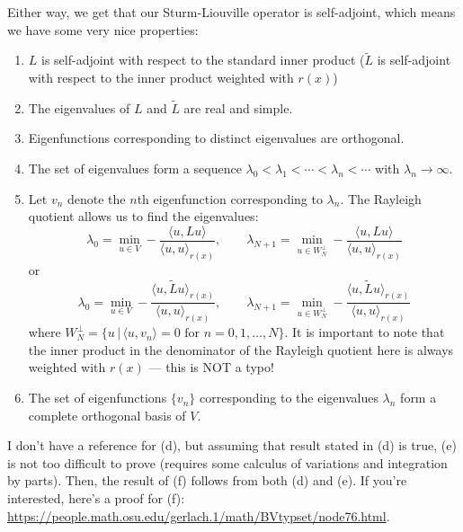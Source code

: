 Either way, we get that our Sturm-Liouville operator is self-adjoint, which means we have some very nice properties:
\begin{enumerate}
\renewcommand{\labelenumi}{(\alph{enumi})}
\item $L$ is self-adjoint with respect to the standard inner product ($\tilde{L}$ is self-adjoint with respect to the inner product weighted with $r(x)$)

\item The eigenvalues of $L$ and $\tilde{L}$ are real and simple.

\item Eigenfunctions corresponding to distinct eigenvalues are orthogonal.

\item The set of eigenvalues form a sequence $\lambda_0 < \lambda_1 < \cdots < \lambda_n < \cdots$ with $\lambda_n \to \infty$.

\item Let $v_n$ denote the $n$th eigenfunction corresponding to $\lambda_n$. The Rayleigh quotient allows us to find the eigenvalues:
$$ \lambda_0 = \min_{u \in V} -\dfrac{\langle u, Lu \rangle}{\langle u, u \rangle_{r(x)}}, \quad \quad \lambda_{N+1} = \min_{u \in W_N^{\perp}}   -\dfrac{\langle u, Lu \rangle}{\langle u, u \rangle_{r(x)}} $$
or
$$ \lambda_0 = \min_{u \in V} -\dfrac{\langle u, \tilde{L}u \rangle_{r(x)}}{\langle u, u \rangle_{r(x)}}, \quad \quad \lambda_{N+1} = \min_{u \in W_N^{\perp}}   -\dfrac{\langle u, \tilde{L}u \rangle_{r(x)}}{\langle u, u \rangle_{r(x)}} $$
where $W_N^{\perp} = \{ u \, | \, \langle u, v_n \rangle = 0 \,\, \text{for} \,\, n = 0, 1, \dots, N \}$. It is important to note that the inner product in the denominator of the Rayleigh quotient here is always weighted with $r(x)$ --- this is NOT a typo!

\item The set of eigenfunctions $\{v_n\}$ corresponding to the eigenvalues $\lambda_n$ form a complete orthogonal basis of $V$.
\end{enumerate}

I don't have a reference for (d), but assuming that result stated in (d) is true, (e) is not too difficult to prove (requires some calculus of variations and integration by parts). Then, the result of (f) follows from both (d) and (e). If you're interested, here's a proof for (f): \url{https://people.math.osu.edu/gerlach.1/math/BVtypset/node76.html}.


